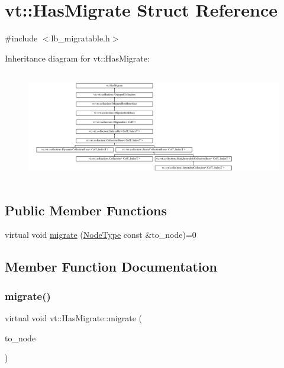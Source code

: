 \hypertarget{structvt_1_1_has_migrate}{}\section{vt\+:\+:Has\+Migrate Struct Reference}
\label{structvt_1_1_has_migrate}


{\ttfamily \#include $<$lb\+\_\+migratable.\+h$>$}

Inheritance diagram for vt\+:\+:Has\+Migrate\+:\begin{figure}[H]
\begin{center}
\leavevmode
\includegraphics[height=4.873803cm]{structvt_1_1_has_migrate}
\end{center}
\end{figure}
\subsection*{Public Member Functions}
\begin{DoxyCompactItemize}
\item 
virtual void \hyperlink{structvt_1_1_has_migrate_a7b35a6214b83de93380f5fc568a744c8}{migrate} (\hyperlink{namespacevt_a866da9d0efc19c0a1ce79e9e492f47e2}{Node\+Type} const \&to\+\_\+node)=0
\end{DoxyCompactItemize}


\subsection{Member Function Documentation}
\mbox{\label{structvt_1_1_has_migrate_a7b35a6214b83de93380f5fc568a744c8}} 
\subsubsection{\texorpdfstring{migrate()}{migrate()}}
{\footnotesize\ttfamily virtual void vt\+::\+Has\+Migrate\+::migrate (\begin{DoxyParamCaption}\item[{\hyperlink{namespacevt_a866da9d0efc19c0a1ce79e9e492f47e2}{Node\+Type} const \&}]{to\+\_\+node }\end{DoxyParamCaption})\hspace{0.3cm}{\ttfamily [pure virtual]}}



